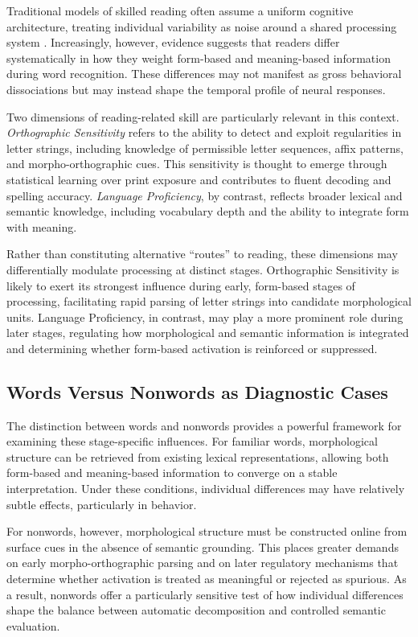 \documentclass[preprint,12pt, authoryear, review]{elsarticle}
\begin{document}
Traditional models of skilled reading often assume a uniform cognitive architecture, treating individual variability as noise around a shared processing system \citep{cronbachTwoDisciplinesScientific1957}. Increasingly, however, evidence suggests that readers differ systematically in how they weight form-based and meaning-based information during word recognition. These differences may not manifest as gross behavioral dissociations but may instead shape the temporal profile of neural responses.

Two dimensions of reading-related skill are particularly relevant in this context. \textit{Orthographic Sensitivity} refers to the ability to detect and exploit regularities in letter strings, including knowledge of permissible letter sequences, affix patterns, and morpho-orthographic cues. This sensitivity is thought to emerge through statistical learning over print exposure and contributes to fluent decoding and spelling accuracy. \textit{Language Proficiency}, by contrast, reflects broader lexical and semantic knowledge, including vocabulary depth and the ability to integrate form with meaning.

Rather than constituting alternative “routes” to reading, these dimensions may differentially modulate processing at distinct stages. Orthographic Sensitivity is likely to exert its strongest influence during early, form-based stages of processing, facilitating rapid parsing of letter strings into candidate morphological units. Language Proficiency, in contrast, may play a more prominent role during later stages, regulating how morphological and semantic information is integrated and determining whether form-based activation is reinforced or suppressed.

\subsection{Words Versus Nonwords as Diagnostic Cases}

The distinction between words and nonwords provides a powerful framework for examining these stage-specific influences. For familiar words, morphological structure can be retrieved from existing lexical representations, allowing both form-based and meaning-based information to converge on a stable interpretation. Under these conditions, individual differences may have relatively subtle effects, particularly in behavior.

For nonwords, however, morphological structure must be constructed online from surface cues in the absence of semantic grounding. This places greater demands on early morpho-orthographic parsing and on later regulatory mechanisms that determine whether activation is treated as meaningful or rejected as spurious. As a result, nonwords offer a particularly sensitive test of how individual differences shape the balance between automatic decomposition and controlled semantic evaluation.
\end{document}
